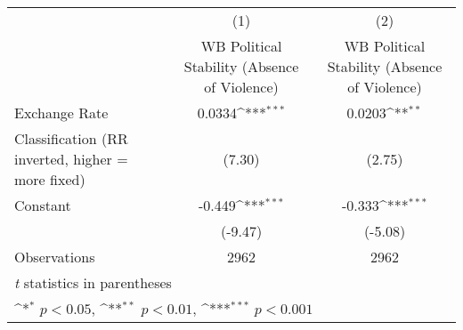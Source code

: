 {
\def\sym#1{\ifmmode^{#1}\else\(^{#1}\)\fi}
\begin{tabular}{l*{2}{c}}
\toprule
                &\multicolumn{1}{c}{(1)}&\multicolumn{1}{c}{(2)}\\
                &\multicolumn{1}{c}{WB Political Stability (Absence of Violence)}&\multicolumn{1}{c}{WB Political Stability (Absence of Violence)}\\
\midrule
Exchange Rate   &   0.0334\sym{***}&   0.0203\sym{**} \\
Classification (RR inverted, higher = more fixed)&   (7.30)         &   (2.75)         \\
\addlinespace
Constant        &   -0.449\sym{***}&   -0.333\sym{***}\\
                &  (-9.47)         &  (-5.08)         \\
\midrule
Observations    &     2962         &     2962         \\
\bottomrule
\multicolumn{3}{l}{\footnotesize \textit{t} statistics in parentheses}\\
\multicolumn{3}{l}{\footnotesize \sym{*} \(p<0.05\), \sym{**} \(p<0.01\), \sym{***} \(p<0.001\)}\\
\end{tabular}
}
